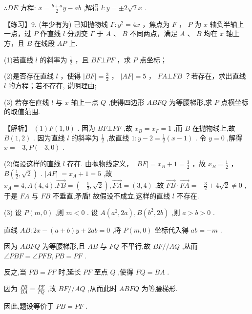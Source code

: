 \documentclass[10pt]{article}
\begin{document}
\(\therefore {DE}\) 方程: \(x = \frac{b + a}{2}y - {ab}\) ,解得 \(l : y =  \pm  2\sqrt{2}x\) .

【练习】9. (年少有为) 已知抛物线 \(\Gamma  : {y}^{2} = {4x}\) ，焦点为 \(F\) ， \(P\) 为 \(x\) 轴负半轴上一点，过 \(P\) 作直线 \(l\) 分别交 \(\Gamma\) 于 \(A\) 、 \(B\) 不同两点，满足 \(A\) 、 \(B\) 均在 \(x\) 轴上方，且 \(B\) 在线段 \({AP}\) 上.

(1)若直线 \(l\) 的斜率为 \(\frac{1}{2}\) ，且 \({BF} \bot  {PF}\) ，求 \(P\) 点坐标；

(2)是否存在直线 \(l\) ，使得 \(\left| {BF}\right|  = \frac{3}{2}\) ， \(\left| {AF}\right|  = 5\) ， \({FA}\bot {FB}\) ？若存在，求出直线 \(l\) 的方程；若不存在, 说明理由;

(3) 若存在直线 \(l\) 与 \(x\) 轴上一点 \(Q\) ,使得四边形 \({ABFQ}\) 为等腰梯形,求 \(P\) 点横坐标的取值范围.

【解析】 \(\left( 1\right) F\left( {1,0}\right)\) . 因为 \({BF} \bot  {PF}\) ,故 \({x}_{B} = {x}_{F} = 1\) ,而 \(B\) 在抛物线上,故 \(B\left( {1,2}\right)\) . 因为直线 \(l\) 的斜率为 \(\frac{1}{2}\) ,故直线 \(1 : y - 2 = \frac{1}{2}\left( {x - 1}\right)\) . 令 \(y = 0\) ,解得 \(x =  - 3,P\left( {-3,0}\right)\) .

(2)假设这样的直线 \(l\) 存在. 由抛物线定义， \(\left| {BF}\right|  = {x}_{B} + 1 = \frac{3}{2}\) ，故 \({x}_{B} = \frac{1}{2}\) ， \(B\left( {\frac{1}{2},\sqrt{2}}\right)\) . \(\left| {AF}\right| \; = {x}_{A} + 1 = 5\) ,故 \({x}_{A} = 4,A\left( {4,4}\right) .\overrightarrow{FB} = \left( {-\frac{1}{2},\sqrt{2}}\right) ,\overrightarrow{FA} = \left( {3,4}\right)\) ,故 \(\overrightarrow{FB} \cdot  \overrightarrow{FA} =  - \frac{3}{2} + 4\sqrt{2} \neq  0\) , 于是 \({FA}\) 与 \({FB}\) 不垂直,矛盾! 故假设不成立,这样的直线 \(l\) 不存在.

(3) 设 \(P\left( {m,0}\right)\) ,则 \(m < 0\) . 设 \(A\left( {{a}^{2},{2a}}\right) ,B\left( {{b}^{2},{2b}}\right)\) ,则 \(a > b > 0\) .

直线 \({AB} : {2x} - \left( {a + b}\right) y + {2ab} = 0\) ,将 \(P\left( {m,0}\right)\) 坐标代入得 \({ab} =  - m\) .

因为 \({ABFQ}\) 为等腰梯形,且 \({AB}\) 与 \({FQ}\) 不平行,故 \({BF}//{AQ}\) ,从而 \(\angle {PBF} = \angle {PFB},{PB} = {PF}\) .

反之,当 \({PB} = {PF}\) 时,延长 \({PF}\) 至点 \(Q\) ,使得 \({FQ} = {BA}\) .

因为 \(\frac{PB}{BA} = \frac{PF}{FQ}\) ,故 \({BF}//{AQ}\) ,从而此时 \({ABFQ}\) 为等腰梯形.

因此,题设等价于 \({PB} = {PF}\) .
\end{document}

